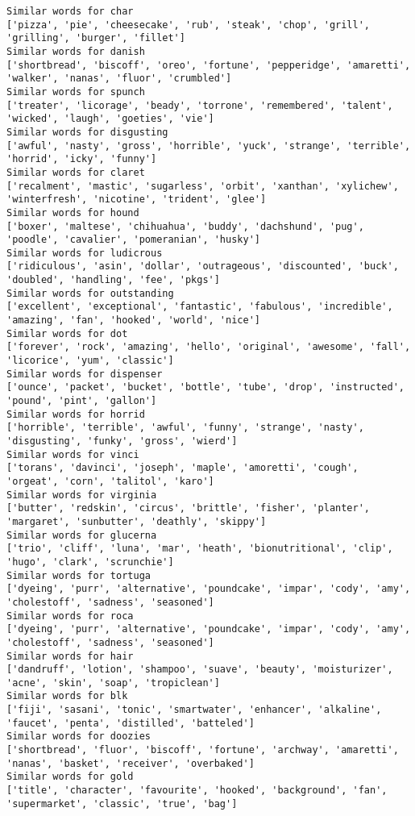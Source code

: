 \documentclass[11pt]{article}
\begin{document}
\begin{Verbatim}[commandchars=\\\{\}]
Similar words for char
['pizza', 'pie', 'cheesecake', 'rub', 'steak', 'chop', 'grill', 'grilling', 'burger', 'fillet']
Similar words for danish
['shortbread', 'biscoff', 'oreo', 'fortune', 'pepperidge', 'amaretti', 'walker', 'nanas', 'fluor', 'crumbled']
Similar words for spunch
['treater', 'licorage', 'beady', 'torrone', 'remembered', 'talent', 'wicked', 'laugh', 'goeties', 'vie']
Similar words for disgusting
['awful', 'nasty', 'gross', 'horrible', 'yuck', 'strange', 'terrible', 'horrid', 'icky', 'funny']
Similar words for claret
['recalment', 'mastic', 'sugarless', 'orbit', 'xanthan', 'xylichew', 'winterfresh', 'nicotine', 'trident', 'glee']
Similar words for hound
['boxer', 'maltese', 'chihuahua', 'buddy', 'dachshund', 'pug', 'poodle', 'cavalier', 'pomeranian', 'husky']
Similar words for ludicrous
['ridiculous', 'asin', 'dollar', 'outrageous', 'discounted', 'buck', 'doubled', 'handling', 'fee', 'pkgs']
Similar words for outstanding
['excellent', 'exceptional', 'fantastic', 'fabulous', 'incredible', 'amazing', 'fan', 'hooked', 'world', 'nice']
Similar words for dot
['forever', 'rock', 'amazing', 'hello', 'original', 'awesome', 'fall', 'licorice', 'yum', 'classic']
Similar words for dispenser
['ounce', 'packet', 'bucket', 'bottle', 'tube', 'drop', 'instructed', 'pound', 'pint', 'gallon']
Similar words for horrid
['horrible', 'terrible', 'awful', 'funny', 'strange', 'nasty', 'disgusting', 'funky', 'gross', 'wierd']
Similar words for vinci
['torans', 'davinci', 'joseph', 'maple', 'amoretti', 'cough', 'orgeat', 'corn', 'talitol', 'karo']
Similar words for virginia
['butter', 'redskin', 'circus', 'brittle', 'fisher', 'planter', 'margaret', 'sunbutter', 'deathly', 'skippy']
Similar words for glucerna
['trio', 'cliff', 'luna', 'mar', 'heath', 'bionutritional', 'clip', 'hugo', 'clark', 'scrunchie']
Similar words for tortuga
['dyeing', 'purr', 'alternative', 'poundcake', 'impar', 'cody', 'amy', 'cholestoff', 'sadness', 'seasoned']
Similar words for roca
['dyeing', 'purr', 'alternative', 'poundcake', 'impar', 'cody', 'amy', 'cholestoff', 'sadness', 'seasoned']
Similar words for hair
['dandruff', 'lotion', 'shampoo', 'suave', 'beauty', 'moisturizer', 'acne', 'skin', 'soap', 'tropiclean']
Similar words for blk
['fiji', 'sasani', 'tonic', 'smartwater', 'enhancer', 'alkaline', 'faucet', 'penta', 'distilled', 'batteled']
Similar words for doozies
['shortbread', 'fluor', 'biscoff', 'fortune', 'archway', 'amaretti', 'nanas', 'basket', 'receiver', 'overbaked']
Similar words for gold
['title', 'character', 'favourite', 'hooked', 'background', 'fan', 'supermarket', 'classic', 'true', 'bag']

\end{Verbatim}
\end{document}
